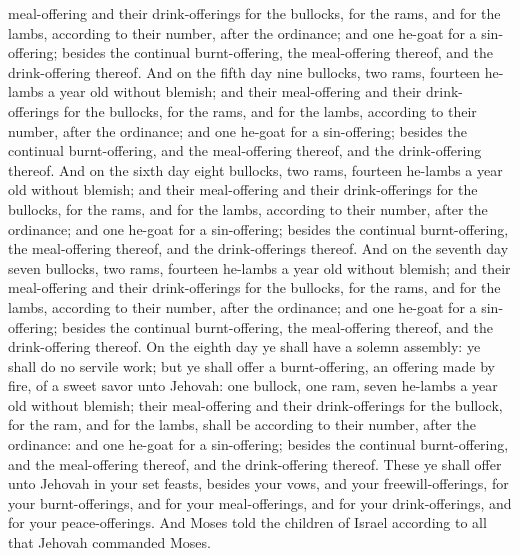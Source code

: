 meal-offering and their drink-offerings for the bullocks, for the rams, and for the lambs, according to their number, after the ordinance; and one he-goat for a sin-offering; besides the continual burnt-offering, the meal-offering thereof, and the drink-offering thereof.  And on the fifth day nine bullocks, two rams, fourteen he-lambs a year old without blemish; and their meal-offering and their drink-offerings for the bullocks, for the rams, and for the lambs, according to their number, after the ordinance; and one he-goat for a sin-offering; besides the continual burnt-offering, and the meal-offering thereof, and the drink-offering thereof.  And on the sixth day eight bullocks, two rams, fourteen he-lambs a year old without blemish; and their meal-offering and their drink-offerings for the bullocks, for the rams, and for the lambs, according to their number, after the ordinance; and one he-goat for a sin-offering; besides the continual burnt-offering, the meal-offering thereof, and the drink-offerings thereof.  And on the seventh day seven bullocks, two rams, fourteen he-lambs a year old without blemish; and their meal-offering and their drink-offerings for the bullocks, for the rams, and for the lambs, according to their number, after the ordinance; and one he-goat for a sin-offering; besides the continual burnt-offering, the meal-offering thereof, and the drink-offering thereof.  On the eighth day ye shall have a solemn assembly: ye shall do no servile work; but ye shall offer a burnt-offering, an offering made by fire, of a sweet savor unto Jehovah: one bullock, one ram, seven he-lambs a year old without blemish; their meal-offering and their drink-offerings for the bullock, for the ram, and for the lambs, shall be according to their number, after the ordinance: and one he-goat for a sin-offering; besides the continual burnt-offering, and the meal-offering thereof, and the drink-offering thereof.  These ye shall offer unto Jehovah in your set feasts, besides your vows, and your freewill-offerings, for your burnt-offerings, and for your meal-offerings, and for your drink-offerings, and for your peace-offerings. And Moses told the children of Israel according to all that Jehovah commanded Moses. 

